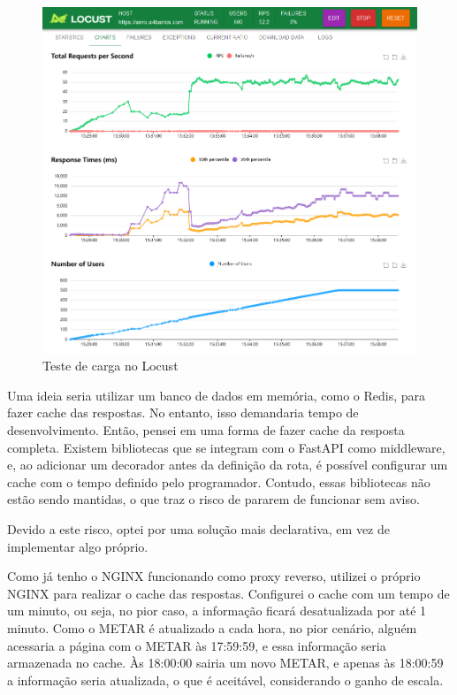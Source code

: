 \begin{figure}[ht]
    \begin{center}
    \includegraphics[width=400pt]{img/locust-no-cache.png}
    \caption{Teste de carga no Locust}
    \label{fig:locust-no-cache}
    \end{center}
\end{figure}


Uma ideia seria utilizar um banco de dados em memória, como o Redis, para fazer 
cache das respostas. No entanto, isso demandaria tempo de desenvolvimento. Então, 
pensei em uma forma de fazer cache da resposta completa. Existem bibliotecas que 
se integram com o FastAPI como middleware, e, ao adicionar um decorador antes da
definição da rota, é possível configurar um cache com o tempo definido pelo 
programador. Contudo, essas bibliotecas não estão sendo mantidas, o que traz o 
risco de pararem de funcionar sem aviso.

Devido a este risco, optei por uma solução mais declarativa, em vez de implementar
algo próprio.

Como já tenho o NGINX funcionando como proxy reverso, utilizei o próprio NGINX 
para realizar o cache das respostas. Configurei o cache com um tempo de um minuto, 
ou seja, no pior caso, a informação ficará desatualizada por até 1 minuto. Como 
o METAR é atualizado a cada hora, no pior cenário, alguém acessaria a página com 
o METAR às 17:59:59, e essa informação seria armazenada no cache. Às 18:00:00 
sairia um novo METAR, e apenas às 18:00:59 a informação seria atualizada, o que
 é aceitável, considerando o ganho de escala.

